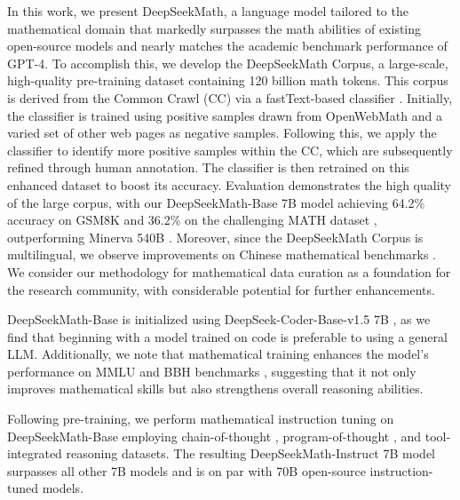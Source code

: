In this work, we present DeepSeekMath, a language model tailored to the mathematical domain that markedly surpasses the math abilities of existing open-source models and nearly matches the academic benchmark performance of GPT-4. To accomplish this, we develop the DeepSeekMath Corpus, a large-scale, high-quality pre-training dataset containing 120 billion math tokens. This corpus is derived from the Common Crawl (CC) via a fastText-based classifier \citep{joulin2016fasttext}. Initially, the classifier is trained using positive samples drawn from OpenWebMath \citep{openwebmath} and a varied set of other web pages as negative samples. Following this, we apply the classifier to identify more positive samples within the CC, which are subsequently refined through human annotation. The classifier is then retrained on this enhanced dataset to boost its accuracy. Evaluation demonstrates the high quality of the large corpus, with our DeepSeekMath-Base 7B model achieving 64.2\% accuracy on GSM8K \citep{gsm8k} and 36.2\% on the challenging MATH dataset \citep{MATH}, outperforming Minerva 540B \citep{minerva}. Moreover, since the DeepSeekMath Corpus is multilingual, we observe improvements on Chinese mathematical benchmarks \citep{wei2023cmath,agieval}. We consider our methodology for mathematical data curation as a foundation for the research community, with considerable potential for further enhancements.

DeepSeekMath-Base is initialized using DeepSeek-Coder-Base-v1.5 7B \citep{deepseek-coder}, as we find that beginning with a model trained on code is preferable to using a general LLM. Additionally, we note that mathematical training enhances the model's performance on MMLU \citep{mmlu} and BBH benchmarks \citep{bbh}, suggesting that it not only improves mathematical skills but also strengthens overall reasoning abilities.

Following pre-training, we perform mathematical instruction tuning on DeepSeekMath-Base employing chain-of-thought \citep{cot}, program-of-thought \citep{pot,pal}, and tool-integrated reasoning \citep{tora} datasets. The resulting DeepSeekMath-Instruct 7B model surpasses all other 7B models and is on par with 70B open-source instruction-tuned models.


